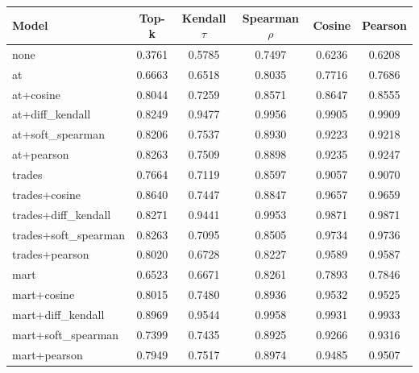 \begin{tabular}{lccccc}
\toprule
Model & Top-k & Kendall $\tau$ & Spearman $\rho$ & Cosine & Pearson \\
\midrule
none & 0.3761 & 0.5785 & 0.7497 & 0.6236 & 0.6208 \\
at & 0.6663 & 0.6518 & 0.8035 & 0.7716 & 0.7686 \\
at+cosine & 0.8044 & 0.7259 & 0.8571 & 0.8647 & 0.8555 \\
at+diff_kendall & 0.8249 & 0.9477 & 0.9956 & 0.9905 & 0.9909 \\
at+soft_spearman & 0.8206 & 0.7537 & 0.8930 & 0.9223 & 0.9218 \\
at+pearson & 0.8263 & 0.7509 & 0.8898 & 0.9235 & 0.9247 \\
trades & 0.7664 & 0.7119 & 0.8597 & 0.9057 & 0.9070 \\
trades+cosine & 0.8640 & 0.7447 & 0.8847 & 0.9657 & 0.9659 \\
trades+diff_kendall & 0.8271 & 0.9441 & 0.9953 & 0.9871 & 0.9871 \\
trades+soft_spearman & 0.8263 & 0.7095 & 0.8505 & 0.9734 & 0.9736 \\
trades+pearson & 0.8020 & 0.6728 & 0.8227 & 0.9589 & 0.9587 \\
mart & 0.6523 & 0.6671 & 0.8261 & 0.7893 & 0.7846 \\
mart+cosine & 0.8015 & 0.7480 & 0.8936 & 0.9532 & 0.9525 \\
mart+diff_kendall & 0.8969 & 0.9544 & 0.9958 & 0.9931 & 0.9933 \\
mart+soft_spearman & 0.7399 & 0.7435 & 0.8925 & 0.9266 & 0.9316 \\
mart+pearson & 0.7949 & 0.7517 & 0.8974 & 0.9485 & 0.9507 \\
\bottomrule
\end{tabular}

